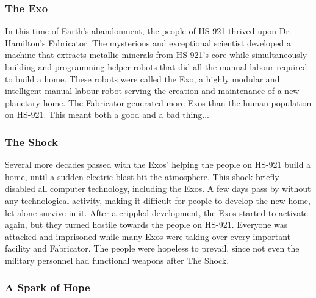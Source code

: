 \documentclass[12pt]{article}
\begin{document}
\subsubsection{The Exo}

In this time of Earth's abandonment, the people of HS-921 thrived upon Dr. Hamilton's Fabricator. The mysterious and exceptional scientist developed a machine that extracts metallic minerals from HS-921's core while simultaneously building and programming helper robots that did all the manual labour required to build a home. These robots were called the Exo, a highly modular and intelligent manual labour robot serving the creation and maintenance of a new planetary home. The Fabricator generated more Exos than the human population on HS-921. This meant both a good and a bad thing...

\subsubsection{The Shock}

Several more decades passed with the Exos' helping the people on HS-921 build a home, until a sudden electric blast hit the atmosphere. This shock briefly disabled all computer technology, including the Exos. A few days pass by without any technological activity, making it difficult for people to develop the new home, let alone survive in it. After a crippled development, the Exos started to activate again, but they turned hostile towards the people on HS-921. Everyone was attacked and imprisoned while many Exos were taking over every important facility and Fabricator. The people were hopeless to prevail, since not even the military personnel had functional weapons after The Shock. 

\subsubsection{A Spark of Hope}
\end{document}
